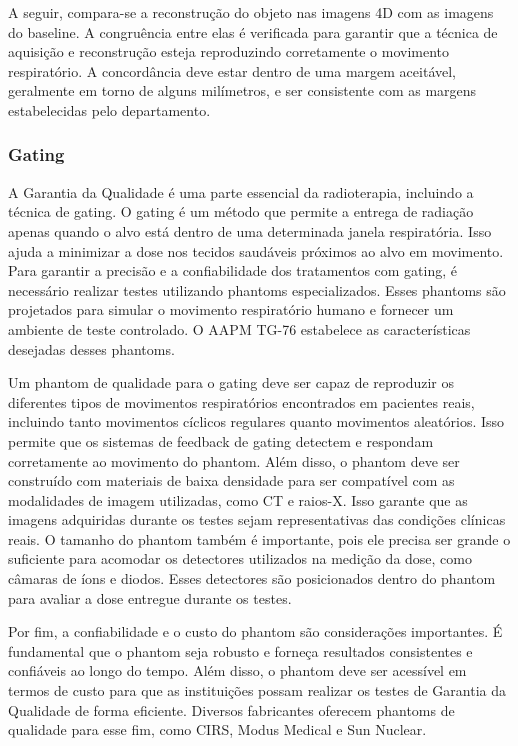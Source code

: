 \documentclass[11pt,a4paper]{article}
\begin{document}
	A seguir, compara-se a reconstrução do objeto nas imagens 4D com as imagens do baseline. A congruência entre elas é verificada para garantir que a técnica de aquisição e reconstrução esteja reproduzindo corretamente o movimento respiratório. A concordância deve estar dentro de uma margem aceitável, geralmente em torno de alguns milímetros, e ser consistente com as margens estabelecidas pelo departamento.
	
\subsubsection*{Gating}

	A Garantia da Qualidade é uma parte essencial da radioterapia, incluindo a técnica de gating. O gating é um método que permite a entrega de radiação apenas quando o alvo está dentro de uma determinada janela respiratória. Isso ajuda a minimizar a dose nos tecidos saudáveis próximos ao alvo em movimento. Para garantir a precisão e a confiabilidade dos tratamentos com gating, é necessário realizar testes utilizando phantoms especializados. Esses phantoms são projetados para simular o movimento respiratório humano e fornecer um ambiente de teste controlado. O AAPM TG-76 estabelece as características desejadas desses phantoms.

	Um phantom de qualidade para o gating deve ser capaz de reproduzir os diferentes tipos de movimentos respiratórios encontrados em pacientes reais, incluindo tanto movimentos cíclicos regulares quanto movimentos aleatórios. Isso permite que os sistemas de feedback de gating detectem e respondam corretamente ao movimento do phantom. Além disso, o phantom deve ser construído com materiais de baixa densidade para ser compatível com as modalidades de imagem utilizadas, como CT e raios-X. Isso garante que as imagens adquiridas durante os testes sejam representativas das condições clínicas reais. O tamanho do phantom também é importante, pois ele precisa ser grande o suficiente para acomodar os detectores utilizados na medição da dose, como câmaras de íons e diodos. Esses detectores são posicionados dentro do phantom para avaliar a dose entregue durante os testes.  

	Por fim, a confiabilidade e o custo do phantom são considerações importantes. É fundamental que o phantom seja robusto e forneça resultados consistentes e confiáveis ao longo do tempo. Além disso, o phantom deve ser acessível em termos de custo para que as instituições possam realizar os testes de Garantia da Qualidade de forma eficiente. Diversos fabricantes oferecem phantoms de qualidade para esse fim, como CIRS, Modus Medical e Sun Nuclear.
\end{document}
